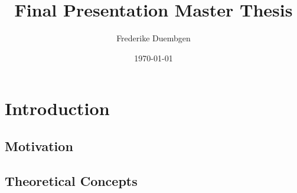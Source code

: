 \documentclass{beamer}
\title{Final Presentation Master Thesis}
\author{Frederike Duembgen}
\date{\today}
\begin{document}
\frame{\titlepage}


\section{Introduction}

\subsection{Motivation}


\subsection{Theoretical Concepts}
\end{document}
